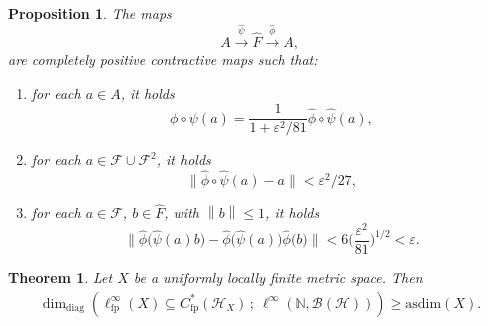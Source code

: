 \documentclass[10pt,a4paper]{amsart}
\newtheorem{thm}{Theorem}
\newtheorem{propo}{Proposition}
\newcommand{\Bcal}{\mathcal{B}}
\newcommand{\Cfp}[1]{C^{\ast}_{\mathrm{fp}}({#1})}
\newcommand{\CfpCartan}[1]{\ell^{\infty}_{\mathrm{fp}}({#1})}
\newcommand{\Fcal}{\mathcal{F}}
\newcommand{\Hcal}{\mathcal{H}}
\newcommand{\N}{\mathbb{N}}
\newcommand{\asdim}[1]{\mathrm{asdim}({#1})}
\newcommand{\bop}[1]{\Bcal({#1})}
\newcommand{\ddimn}[3]{\dim_{\mathrm{diag}}({#1}\subseteq{#2}\, ;~{#3})}
\newcommand{\e}{\varepsilon}
\newcommand{\norm}[1]{{\left\lVert #1 \right \rVert}}
\newcommand{\normBig}[1]{{\Big\lVert #1 \Big \rVert}}
\begin{document}
    \begin{propo}  \label{prop:capCpcMaps}
    The  maps 
    \[ A \overset{\widehat{\psi}}{\longrightarrow} \widehat{F} \overset{\widehat{\phi}}{\longrightarrow} A,\]
    are
    completely positive contractive maps
    such that:
        \begin{enumerate} \renewcommand{\labelenumi}{(\roman{enumi})}
            \item for each $a \in A$, it holds
            \begin{equation*}
             \phi \circ \psi (a) = \frac{1}{1+\e^2/81} \widehat{\phi} \circ \widehat{\psi} (a),
            \end{equation*}
            \item 
                 for each $a \in \Fcal \cup \Fcal^2$, it holds
            \begin{equation*}
        \normBig{\widehat{\phi} \circ \widehat{\psi}(a) - a} < \e^2/27,
    \end{equation*}
            \item for each $a \in \Fcal$, $b \in \widehat{F}$, with $\norm{b} \le 1$, it holds
            \begin{equation*} \label{ineq:capCpcMapsBound}
        \normBig{ \widehat{\phi} \big( \widehat{\psi}(a) b \big) - \widehat{\phi}\big(\widehat{\psi}(a)\big) \widehat{\phi}\big(b\big)} 
        < 6 \Big(\frac{\e^2}{81}\Big)^{1/2}  < \e.
    \end{equation*}
        \end{enumerate}
    \end{propo}

\begin{thm}  \label{thm:lowerBoundFPAlg}
    Let $X$ be a uniformly locally finite metric space.
    Then
    \begin{align*}
         \ddimn{\CfpCartan{X}}{\Cfp{\Hcal_X}}{\ell^\infty(\N, \bop{\Hcal})} \ge \asdim{X}.
    \end{align*}
\end{thm}
\end{document}
